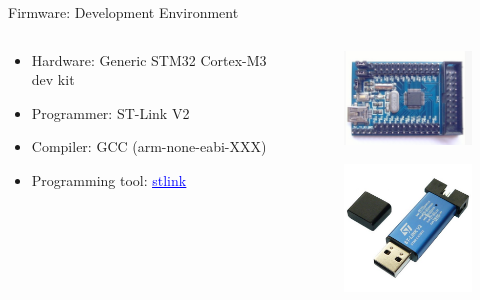 
\begin{frame}{Firmware: Development Environment}

    \begin{columns}[t]
        \begin{column}[t]{0.6\textwidth}
            \begin{itemize}
                \vspace{0.4cm}
                \item Hardware: Generic STM32 Cortex-M3 dev kit
                \vspace{0.4cm}
                \item Programmer: ST-Link V2
                \vspace{0.4cm}
                \item Compiler: GCC (arm-none-eabi-XXX)
                \vspace{0.4cm}
                \item Programming tool: \href{https://github.com/stlink-org/stlink}{\textcolor{blue}{\underline{stlink}}}
            \end{itemize}
        \end{column}
        \begin{column}[t]{0.4\textwidth}
            \begin{figure}[!ht]
                \begin{center}
                    \includegraphics[width=4cm]{figures/stm32-dev-kit}
                \end{center}
            \end{figure}
            \begin{figure}[!ht]
                \begin{center}
                    \includegraphics[width=3.5cm]{figures/stlink-v2}
                \end{center}
            \end{figure}
        \end{column}
    \end{columns}
\end{frame}

